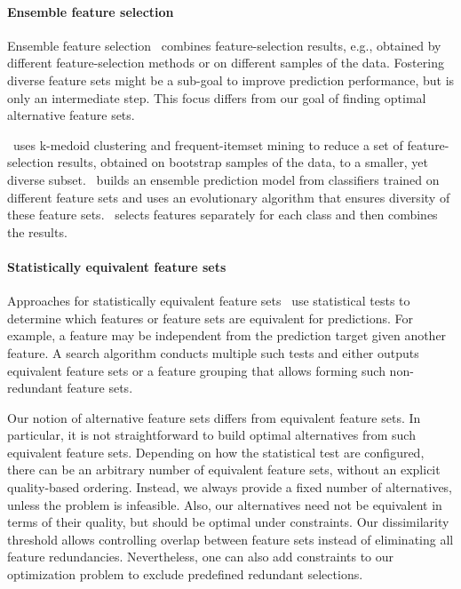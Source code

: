 \documentclass{article}
\theoremstyle{definition}
\begin{document}
\paragraph{Ensemble feature selection}

Ensemble feature selection~\cite{saeys2008robust, seijo2017ensemble} combines feature-selection results, e.g., obtained by different feature-selection methods or on different samples of the data.
Fostering diverse feature sets might be a sub-goal to improve prediction performance, but is only an intermediate step.
This focus differs from our goal of finding optimal alternative feature sets.

\cite{woznica2012model}~uses k-medoid clustering and frequent-itemset mining to reduce a set of feature-selection results, obtained on bootstrap samples of the data, to a smaller, yet diverse subset.
\cite{liu2019subspace}~builds an ensemble prediction model from classifiers trained on different feature sets and uses an evolutionary algorithm that ensures diversity of these feature sets.
\cite{guru2018alternative}~selects features separately for each class and then combines the results.

\paragraph{Statistically equivalent feature sets}

Approaches for statistically equivalent feature sets~\cite{borboudakis2021extending, lagani2017feature} use statistical tests to determine which features or feature sets are equivalent for predictions.
For example, a feature may be independent from the prediction target given another feature.
A search algorithm conducts multiple such tests and either outputs equivalent feature sets or a feature grouping that allows forming such non-redundant feature sets.

Our notion of alternative feature sets differs from equivalent feature sets.
In particular, it is not straightforward to build optimal alternatives from such equivalent feature sets.
Depending on how the statistical test are configured, there can be an arbitrary number of equivalent feature sets, without an explicit quality-based ordering.
Instead, we always provide a fixed number of alternatives, unless the problem is infeasible.
Also, our alternatives need not be equivalent in terms of their quality, but should be optimal under constraints.
Our dissimilarity threshold allows controlling overlap between feature sets instead of eliminating all feature redundancies.
Nevertheless, one can also add constraints to our optimization problem to exclude predefined redundant selections.
\end{document}
